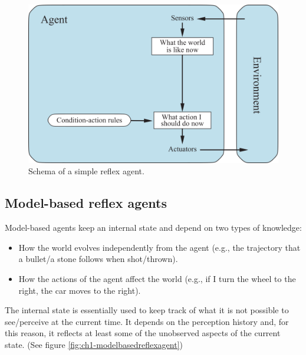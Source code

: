 \begin{figure}[hbt]
    \centering
    \includegraphics{Images/Chapter 1/simple-reflex-agents.png}
    \caption{Schema of a simple reflex agent.}
    \label{fig:ch1-simplereflexagent}
\end{figure}

\subsection{Model-based reflex agents}
Model-based agents keep an internal state and depend on two types of knowledge:

\begin{itemize}
    \item How the world evolves independently from the agent (e.g., the trajectory that a bullet/a stone follows when shot/thrown).
    \item How the actions of the agent affect the world (e.g., if I turn the wheel to the right, the car moves to the right).
\end{itemize}

The internal state is essentially used to keep track of what it is not possible to see/perceive at the current time. It depends on the perception history and, for this reason, it reflects at least some of the unobserved aspects of the current state. (See figure \ref{fig:ch1-modelbasedreflexagent})

